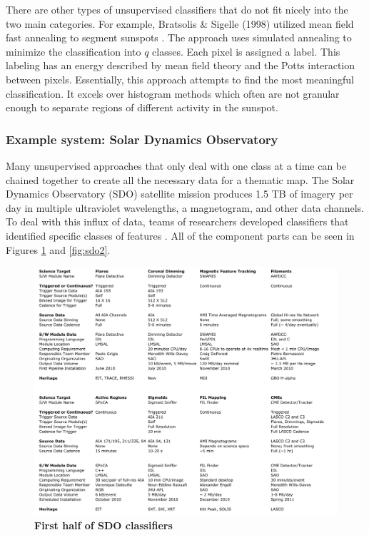 \documentclass[twoside]{report}
\begin{document}
There are other types of unsupervised classifiers that do not fit nicely into the two main categories. For example, Bratsolis \& Sigelle (1998) utilized mean field fast annealing to segment sunspots \cite{bratsolis1998solar}. The approach uses simulated annealing to minimize the classification into $q$ classes. Each pixel is assigned a label. This labeling has an energy described by mean field theory and the Potts interaction between pixels. Essentially, this approach attempts to find the most meaningful classification. It excels over histogram methods which often are not granular enough to separate regions of different activity in the sunspot.

\subsubsection{Example system: Solar Dynamics Observatory}
Many unsupervised approaches that only deal with one class at a time can be chained together to create all the necessary data for a thematic map. The Solar Dynamics Observatory (SDO) satellite mission produces 1.5 TB of imagery per day in multiple ultraviolet wavelengths, a magnetogram, and other data channels. To deal with this influx of data, teams of researchers developed classifiers that identified specific classes of features \cite{sdo}. All of the component parts can be seen in Figures \ref{fig:sdo1} and \ref{fig:sdo2}.

\begin{figure}[ht]
  \begin{center}
    \includegraphics[scale=0.5]{sdo1.png}
    \caption{{\bf First half of SDO classifiers} \cite{sdo}}
    \label{fig:sdo1}
 \end{center}
\end{figure}
\end{document}
